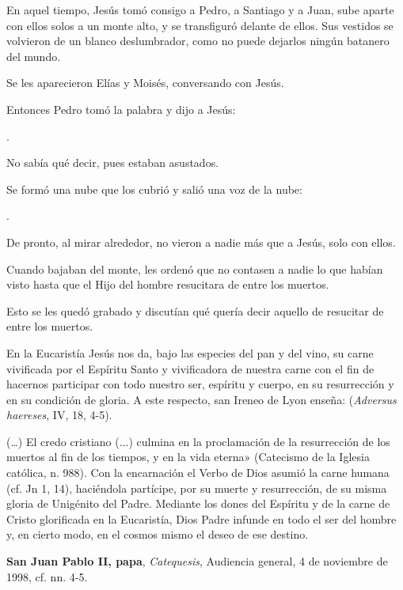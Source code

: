 \begin{scripture}
En aquel tiempo, Jesús tomó consigo a Pedro, a Santiago y a Juan, sube aparte con ellos solos a un monte alto, y se transfiguró delante de ellos. Sus vestidos se volvieron de un blanco deslumbrador, como no puede dejarlos ningún batanero del mundo.

Se les aparecieron Elías y Moisés, conversando con Jesús.

Entonces Pedro tomó la palabra y dijo a Jesús:

.

No sabía qué decir, pues estaban asustados.

Se formó una nube que los cubrió y salió una voz de la nube:

.

De pronto, al mirar alrededor, no vieron a nadie más que a Jesús, solo con ellos.

Cuando bajaban del monte, les ordenó que no contasen a nadie lo que habían visto hasta que el Hijo del hombre resucitara de entre los muertos.

Esto se les quedó grabado y discutían qué quería decir aquello de resucitar de entre los muertos.
\end{scripture}

\begin{patercite}
En la Eucaristía Jesús nos da, bajo las especies del pan y del vino, su carne vivificada por el Espíritu Santo y vivificadora de nuestra carne con el fin de hacernos participar con todo nuestro ser, espíritu y cuerpo, en su resurrección y en su condición de gloria. A este respecto, san Ireneo de Lyon enseña:  (\textit{Adversus haereses}, IV, 18, 4-5).


(\ldots) El credo cristiano (...) culmina en la proclamación de la resurrección de los muertos al fin de los tiempos, y en la vida eterna» (Catecismo de la Iglesia católica, n. 988). Con la encarnación el Verbo de Dios asumió la carne humana (cf. Jn 1, 14), haciéndola partícipe, por su muerte y resurrección, de su misma gloria de Unigénito del Padre. Mediante los dones del Espíritu y de la carne de Cristo glorificada en la Eucaristía, Dios Padre infunde en todo el ser del hombre y, en cierto modo, en el cosmos mismo el deseo de ese destino.

\textbf{San Juan Pablo II, papa}, \textit{Catequesis}, Audiencia general, 4 de noviembre de 1998, cf. nn. 4-5. 
\end{patercite}

